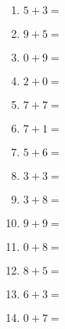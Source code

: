 \documentclass{article}
\begin{document}
\begin{multicols}{5}
\begin{enumerate}
\item $5 + 3 =$
\item $9 + 5 =$
\item $0 + 9 =$
\item $2 + 0 =$
\item $7 + 7 =$
\item $7 + 1 =$
\item $5 + 6 =$
\item $3 + 3 =$
\item $3 + 8 =$
\item $9 + 9 =$
\item $0 + 8 =$
\item $8 + 5 =$
\item $6 + 3 =$
\item $0 + 7 =$

\end{enumerate}
\end{multicols}
\end{document}
